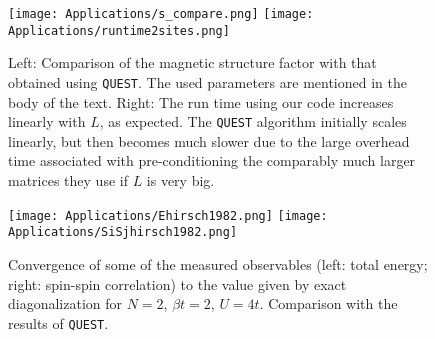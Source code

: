 \begin{figure}[H]
\hspace{0.1cm}
\texttt{[image: Applications/s\_compare.png]}
\hspace{0.5cm}
\texttt{[image: Applications/runtime2sites.png]}
\caption[Comparison of the magnetic structure factor with that obtained using \texttt{QUEST}. Run time comparison.]{Left: Comparison of the magnetic structure factor with that obtained using \texttt{QUEST}.
The used parameters are mentioned in the body of the text.
Right: The run time using our code increases linearly with $L$, as expected.
The \texttt{QUEST} algorithm initially scales linearly, but then becomes much slower due to the large overhead time associated with pre-conditioning the comparably much larger matrices they use if $L$ is very big.\label{fig:quest_time}}
\end{figure}
\vspace{-0.5cm}
\begin{figure}[H]
\texttt{[image: Applications/Ehirsch1982.png]}
\hspace{0.3cm}
\texttt{[image: Applications/SiSjhirsch1982.png]}
\caption[Convergence of some of the measured observables to the value given by exact diagonalization for $N=2$, $\beta t = 2 $, $U = 4 t$.
Comparison with the results of \texttt{QUEST}.]{Convergence of some of the measured observables (left: total energy; right: spin-spin correlation) to the value given by exact diagonalization for $N=2$, $\beta t = 2 $, $U = 4 t$.
Comparison with the results of \texttt{QUEST}.\label{fig:hirsch1982}}
\end{figure}

